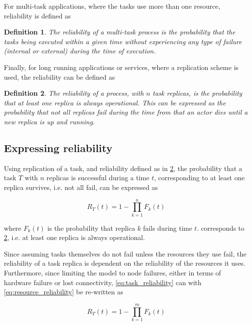 \documentclass{cslthse-msc}
\newtheorem{definition}{Definition}[chapter]
\begin{document}
For multi-task applications, where the tasks use more than one resource, reliability is defined as
\begin{definition} \label{def:multi_task_reliability}
The reliability of a multi-task process is the probability that the tasks being executed within a given time without experiencing any type of failure (internal or external) during the time of execution.
\end{definition}

Finally, for long running applications or services, where a replication scheme is used, the reliability can be defined as \cite{effTaskReplMobGrid}
\begin{definition} \label{def:task_replica_reliability}
The reliability of a process, with $n$ task replicas, is the probability that at least one replica is always operational. This can be expressed as the probability that not all replicas fail during the time from that an actor dies until a new replica is up and running.
\end{definition}

\subsection{Expressing reliability}\label{subsec:design_reliability}
Using replication of a task, and reliability defined as in \cref{def:task_replica_reliability}, the probability that a task $T$ with $n$ replicas is successful during a time $t$, corresponding to at least one replica survives, i.e. not all fail, can be expressed as 

\begin{equation} \label{eq:task_reliability}
R_{T}(t) = 1 - \prod\limits_{k=1}^n F_{k}(t)
\end{equation}

where $F_{k}(t)$ is the probability that replica $k$ fails during time $t$.  corresponds to \cref{def:task_replica_reliability}, i.e. at least one replica is always operational.

Since assuming tasks themselves do not fail unless the resources they use fail, the reliability of a task replica is dependent on the reliability of the resources it uses. Furthermore, since limiting the model to node failures, either in terms of hardware failure or lost connectivity, \cref{eq:task_reliability} can with \cref{eq:resource_reliability} be re-written as

\begin{equation} \label{eq:task_reliability_2}
R_{T}(t) = 1 - \prod\limits_{k=1}^m F_{k}(t)
\end{equation}
\end{document}
